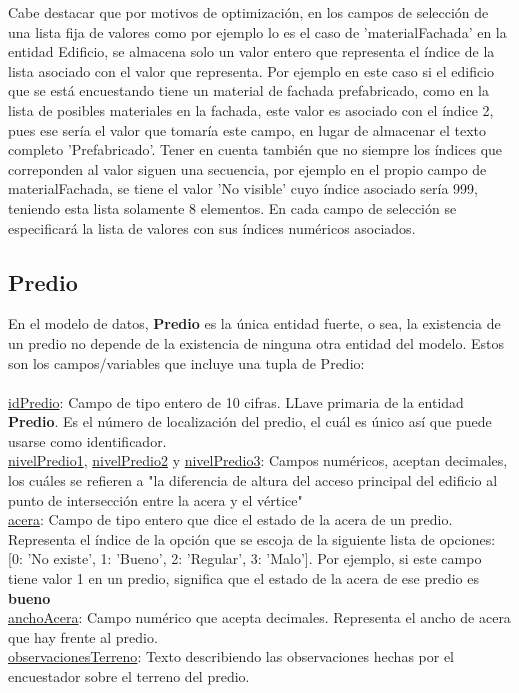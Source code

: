 Cabe destacar que por motivos de optimización, en los campos de selección de una lista fija de valores como por ejemplo lo es el caso de 'materialFachada' en la entidad Edificio, se almacena solo un valor entero que representa el índice de
la lista asociado con el valor que representa. Por ejemplo en este caso si el edificio que se está encuestando tiene un material de fachada prefabricado, como en la lista de posibles materiales en la fachada, este valor es asociado con el índice 2,
pues ese sería el valor que tomaría este campo, en lugar de almacenar el texto completo 'Prefabricado'. Tener en cuenta también que no siempre los índices que correponden al valor siguen una secuencia, por ejemplo en el propio campo de materialFachada,
se tiene el valor 'No visible' cuyo índice asociado sería 999, teniendo esta lista solamente 8 elementos. En cada campo de selección se especificará la lista de valores con sus índices numéricos asociados.
\subsection{Predio}
En el modelo de datos, \textbf{Predio} es la única entidad fuerte, o sea, la existencia de un predio no depende de la existencia de ninguna otra entidad del modelo. Estos son los campos/variables que incluye una tupla de Predio:\\\\
\underline{idPredio}: Campo de tipo entero de 10 cifras. LLave primaria de la entidad \textbf{Predio}. Es el número de localización del predio, el cuál es único así que puede usarse como identificador.\\
\underline{nivelPredio1}, \underline{nivelPredio2} y \underline{nivelPredio3}: Campos numéricos, aceptan decimales, los cuáles se refieren a "la
diferencia de altura del acceso principal del edificio al punto de intersección entre la acera y el vértice"\\
\underline{acera}: Campo de tipo entero que dice el estado de la acera de un predio. Representa el índice de la opción que se escoja de la siguiente lista de opciones: [0: 'No existe', 1: 'Bueno', 2: 'Regular', 3: 'Malo']. Por ejemplo,
si este campo tiene valor 1 en un predio, significa que el estado de la acera de ese predio es \textbf{bueno}\\
\underline{anchoAcera}: Campo numérico que acepta decimales. Representa el ancho de acera que hay frente al predio.\\
\underline{observacionesTerreno}: Texto describiendo las observaciones hechas por el encuestador sobre el terreno del predio.\\\\
